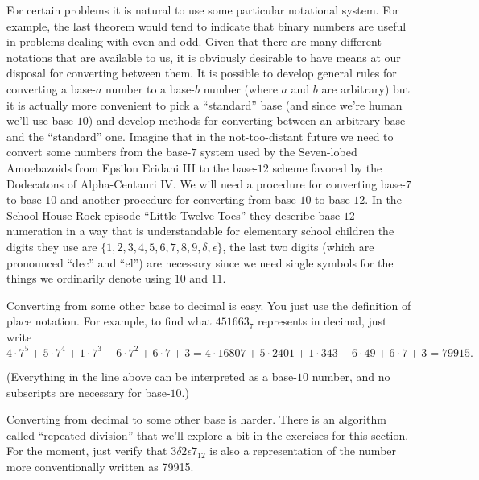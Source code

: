 \documentclass[10pt,]{book}
\theoremstyle{plain}
\theoremstyle{definition}
\theoremstyle{definition}
\numberwithin{equation}{section}
\begin{document}
      For certain problems it is natural to use some particular notational system.
      For example, the
      last theorem would tend to indicate that binary numbers are useful
      in problems dealing with even and odd. Given that there are many different
      notations that are available to us, it is obviously desirable to have
      means at our disposal for converting between them. It is possible to
      develop general rules for converting a base-\(a\) number to a base-\(b\)
      number (where \(a\) and \(b\) are arbitrary) but it is actually more convenient
      to pick a ``standard'' base (and since we're human we'll use base-\(10\))
      and develop methods for converting between an arbitrary base and the
      ``standard'' one. Imagine that in the not-too-distant future we need to
      convert some numbers from the base-\(7\) system used by the Seven-lobed
      Amoebazoids from Epsilon Eridani III to the base-\(12\) scheme favored
      by the Dodecatons of Alpha-Centauri IV. We will need a procedure
      for converting base-\(7\) to base-\(10\) and another procedure for converting
      from base-\(10\) to base-\(12\). In the School House Rock episode
      ``Little Twelve Toes'' they describe base-\(12\)
      numeration in a way that is understandable for elementary school
      children \textemdash{} the digits they use are
      \(\{1, 2, 3, 4, 5, 6, 7, 8, 9, \delta, \epsilon \}\), the last two digits
      (which are pronounced ``dec'' and ``el'') are necessary since we need
      single symbols for the things we ordinarily denote using \(10\) and \(11\).
\par

      Converting from some other base to decimal is easy. You just use the
      definition of place notation. For example, to find what \(451663_7\)
      represents in decimal, just write
      \begin{equation*}
        4 \cdot 7^5 + 5 \cdot 7^4 + 1 \cdot 7^3 + 6 \cdot 7^2 + 6 \cdot 7 + 3 =  4 \cdot 16807 + 5 \cdot 2401 + 1 \cdot 343 + 6 \cdot 49 + 6 \cdot 7 + 3 = 79915.
      \end{equation*}
\par

      (Everything in the line above can be interpreted as a base-\(10\) number,
      and no subscripts are necessary for base-\(10\).)
\par

      Converting from decimal to some other base is harder. There is an algorithm
      called ``repeated division'' that we'll explore a bit in the exercises
      for this section. For the moment, just verify that
      \(3\delta 2\epsilon 7_{12}\) is also a representation of the
      number more conventionally written as 79915.
\typeout{************************************************}
\typeout{************************************************}
\end{document}
